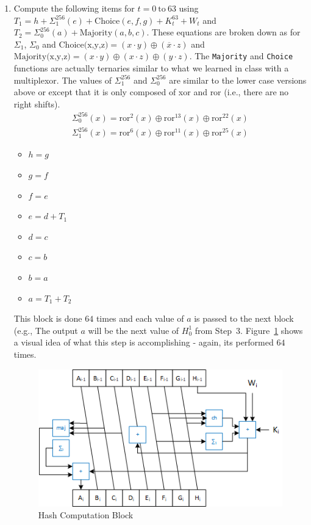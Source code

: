\documentclass{article}
\begin{document}
\begin{enumerate}
    \item Compute the following items for $t = 0~\text{to}~63$ using      
      $T_1 = h + \Sigma_1^{256} (e) + \text{Choice}(e,f,g) + K_t^{63} + W_t$ and
      $T_2 = \Sigma_0^{256} (a) + \text{Majority}(a,b,c)$.  These 
      equations are broken down as for $\Sigma_1$, $\Sigma_0$
      and $\text{Choice(x,y,z)} = (x \cdot y) \oplus (\overline{x} \cdot z)$ and
      $\text{Majority(x,y,z)} = (x \cdot y) \oplus (x \cdot z) \oplus (y
      \cdot z)$.  The \verb!Majority! and \verb!Choice! functions are
      actually ternaries similar to what we learned in class with a
      multiplexor.
      The values of $\Sigma_1^{256}$ and $\Sigma_0^{256}$
      are similar to the lower case versions above or except that it
      is only composed of xor and ror (i.e., there are no right shifts).
      \begin{eqnarray*}
        \Sigma_0^{256}(x) = \text{ror}^{2}(x) \oplus \text{ror}^{13}(x) \oplus \text{ror}^{22}(x)    \\
        \Sigma_1^{256}(x) = \text{ror}^{6}(x) \oplus \text{ror}^{11}(x) \oplus \text{ror}^{25}(x)    
      \end{eqnarray*}
  \begin{itemize}
  \item $h = g$
  \item $g = f$
  \item $f = e$
  \item $e = d + T_1$
  \item $d = c$
  \item $c = b$
  \item $b = a$
  \item $a = T_1 + T_2$
  \end{itemize}
  This block is done $64$ times and each value of $a$ is passed to the
  next block (e.g., The output $a$ will be the next value of $H_0^1$
  from Step~$3$.  Figure~\ref{sha256compression.fig} shows a visual idea
  of what this step is accomplishing - again, its performed $64$
  times.
  \begin{figure}
  \centering
  \includegraphics[scale=0.95]{sha256compression.png}
  \caption{Hash Computation Block}
  \label{sha256compression.fig}
  \end{figure}
  

\end{enumerate}
\end{document}
